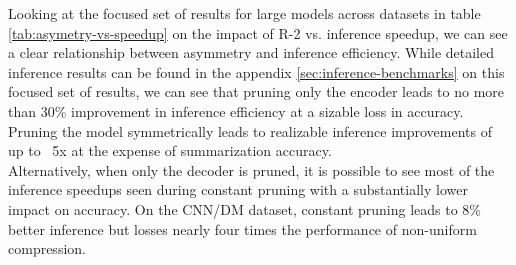 Looking at the focused set of results for large models across datasets in table \ref{tab:asymetry-vs-speedup} on the impact of R-2 vs. inference speedup, we can see a clear relationship between asymmetry and inference efficiency. While detailed inference results can be found in the appendix \ref{sec:inference-benchmarks} on this focused set of results, we can see that pruning only the encoder leads to no more than 30\% improvement in inference efficiency at a sizable loss in accuracy. Pruning the model symmetrically leads to realizable inference improvements of up to ~5x at the expense of summarization accuracy. \\ 
Alternatively, when only the decoder is pruned, it is possible to see most of the inference speedups seen during constant pruning with a substantially lower impact on accuracy. On the CNN/DM dataset, constant pruning leads to 8\% better inference but losses nearly four times the performance of non-uniform compression.  \\
\begin{table}[!htb!]
    \centering
    \small
    \caption{Relationship between accuracy and speedup of encoder only, decoder only, encoder and decoder pruning on FLAN-T5 models on QIWS concerning model size. Speedup is measured by comparing the improvements in latency for batch size one vs. the uncompressed baseline. The impact is the relative loss of Rouge-2 of compressed models vs. the uncompressed baseline.}
    \label{tab:scale-asym-speedup}
\end{table}
